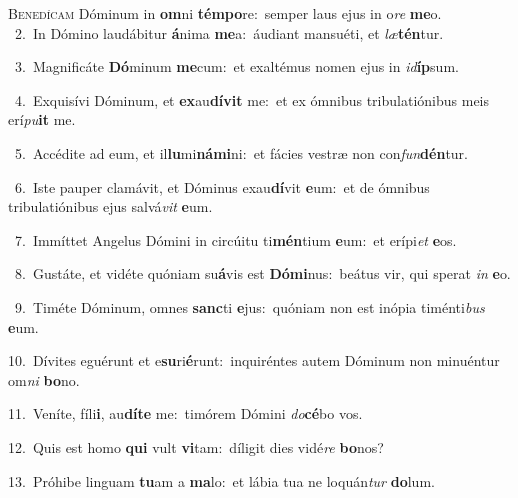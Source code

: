 \lettrine{\initial\textcolor{\initialcolor}{B}}{enedícam} Dóminum in \textbf{om}\-ni \textbf{tém}\-\textbf{po}re:~\star semper laus ejus in o\textit{re} \textbf{me}\-o.\\
{\numbfont\textcolor{\numbcolor}{~2.}}~In Dómino laudábitur \textbf{á}\-nima \textbf{me}\-a:~\star áudiant mansuéti, et \textit{læ}\-\textbf{tén}tur.\par
{\numbfont\textcolor{\numbcolor}{~3.}}~Magnificáte \textbf{Dó}\-minum \textbf{me}\-cum:~\star et exaltémus nomen ejus in \textit{id}\-\textbf{íp}sum.\par
{\numbfont\textcolor{\numbcolor}{~4.}}~Exquisívi Dóminum, et \textbf{ex}\-au\-\textbf{dí}\-\textbf{vit} me:~\star et ex ómnibus tribulatiónibus meis erí\-\textit{pu}\-\textbf{it} me.\par
{\numbfont\textcolor{\numbcolor}{~5.}}~Accédite ad eum, et il\-\textbf{lu}\-mi\-\textbf{ná}\-\textbf{mi}ni:~\star et fácies vestræ non con\-\textit{fun}\-\textbf{dén}tur.\par
{\numbfont\textcolor{\numbcolor}{~6.}}~Iste pauper clamávit, et Dóminus exau\-\textbf{dí}\-vit \textbf{e}\-um:~\star et de ómnibus tribulatiónibus ejus salvá\textit{vit} \textbf{e}\-um.\par
{\numbfont\textcolor{\numbcolor}{~7.}}~Immíttet Angelus Dómini in circúitu ti\-\textbf{mén}\-tium \textbf{e}\-um:~\star et erípi\textit{et} \textbf{e}\-os.\par
{\numbfont\textcolor{\numbcolor}{~8.}}~Gustáte, et vidéte quóniam su\-\textbf{á}\-vis est \textbf{Dó}\-\textbf{mi}nus:~\star beátus vir, qui sperat \textit{in} \textbf{e}\-o.\par
{\numbfont\textcolor{\numbcolor}{~9.}}~Timéte Dóminum, omnes \textbf{sanc}\-ti \textbf{e}\-jus:~\star quóniam non est inópia timénti\textit{bus} \textbf{e}\-um.\par
{\numbfont\textcolor{\numbcolor}{10.}}~Dívites eguérunt et e\-\textbf{su}\-ri\-\textbf{é}\-runt:~\star inquiréntes autem Dóminum non minuéntur om\textit{ni} \textbf{bo}\-no.\par
{\numbfont\textcolor{\numbcolor}{11.}}~Veníte, fíli\-\textbf{i}\-, au\-\textbf{dí}\-\textbf{te} me:~\star timórem Dómini \textit{do}\-\textbf{cé}bo vos.\par
{\numbfont\textcolor{\numbcolor}{12.}}~Quis est homo \textbf{qui} vult \textbf{vi}\-tam:~\star díligit dies vidé\textit{re} \textbf{bo}\-nos?\par
{\numbfont\textcolor{\numbcolor}{13.}}~Próhibe linguam \textbf{tu}\-am a \textbf{ma}\-lo:~\star et lábia tua ne loquán\textit{tur} \textbf{do}\-lum.\par
